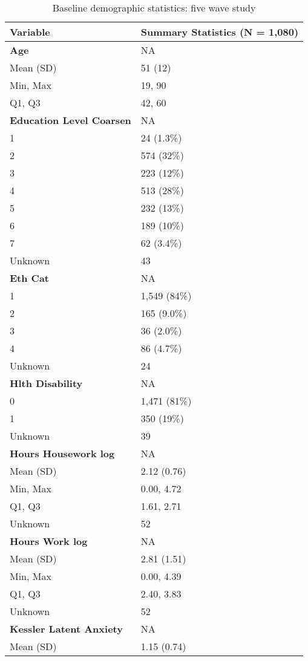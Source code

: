 \documentclass[
  single column]{article}
\begin{document}
\begin{longtable}[]{@{}ll@{}}

\caption{\label{tbl-table-demography-five-code-long}Baseline demographic
statistics: five wave study}

\tabularnewline

\toprule\noalign{}
Variable & Summary Statistics (N = 1,080) \\
\midrule\noalign{}
\endhead
\bottomrule\noalign{}
\endlastfoot
\textbf{Age} & NA \\
Mean (SD) & 51 (12) \\
Min, Max & 19, 90 \\
Q1, Q3 & 42, 60 \\
\textbf{Education Level Coarsen} & NA \\
1 & 24 (1.3\%) \\
2 & 574 (32\%) \\
3 & 223 (12\%) \\
4 & 513 (28\%) \\
5 & 232 (13\%) \\
6 & 189 (10\%) \\
7 & 62 (3.4\%) \\
Unknown & 43 \\
\textbf{Eth Cat} & NA \\
1 & 1,549 (84\%) \\
2 & 165 (9.0\%) \\
3 & 36 (2.0\%) \\
4 & 86 (4.7\%) \\
Unknown & 24 \\
\textbf{Hlth Disability} & NA \\
0 & 1,471 (81\%) \\
1 & 350 (19\%) \\
Unknown & 39 \\
\textbf{Hours Housework log} & NA \\
Mean (SD) & 2.12 (0.76) \\
Min, Max & 0.00, 4.72 \\
Q1, Q3 & 1.61, 2.71 \\
Unknown & 52 \\
\textbf{Hours Work log} & NA \\
Mean (SD) & 2.81 (1.51) \\
Min, Max & 0.00, 4.39 \\
Q1, Q3 & 2.40, 3.83 \\
Unknown & 52 \\
\textbf{Kessler Latent Anxiety} & NA \\
Mean (SD) & 1.15 (0.74) \\

\end{longtable}
\end{document}
